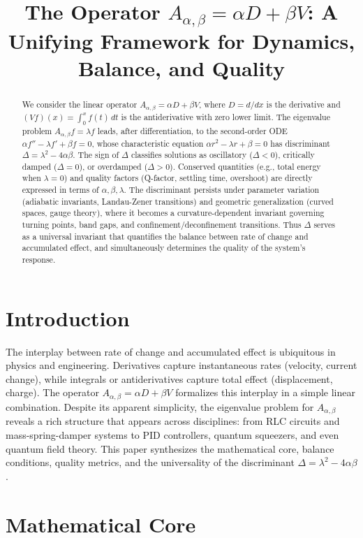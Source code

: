 \documentclass[11pt]{article}
\title{The Operator $A_{\alpha,\beta} = \alpha D + \beta V$: A Unifying Framework for Dynamics, Balance, and Quality}
\author{}
\date{}
\begin{document}
\maketitle
\begin{abstract}
We consider the linear operator $A_{\alpha,\beta} = \alpha D + \beta V$, where $D = d/dx$ is the derivative and $(V f)(x) = \int_0^x f(t)\,dt$ is the antiderivative with zero lower limit. The eigenvalue problem $A_{\alpha,\beta}f = \lambda f$ leads, after differentiation, to the second-order ODE $\alpha f'' - \lambda f' + \beta f = 0$, whose characteristic equation $\alpha r^2 - \lambda r + \beta = 0$ has discriminant $\Delta = \lambda^2 - 4\alpha\beta$. The sign of $\Delta$ classifies solutions as oscillatory ($\Delta<0$), critically damped ($\Delta=0$), or overdamped ($\Delta>0$). Conserved quantities (e.g., total energy when $\lambda=0$) and quality factors (Q-factor, settling time, overshoot) are directly expressed in terms of $\alpha,\beta,\lambda$. The discriminant persists under parameter variation (adiabatic invariants, Landau-Zener transitions) and geometric generalization (curved spaces, gauge theory), where it becomes a curvature-dependent invariant governing turning points, band gaps, and confinement/deconfinement transitions. Thus $\Delta$ serves as a universal invariant that quantifies the balance between rate of change and accumulated effect, and simultaneously determines the quality of the system's response.
\end{abstract}

\section{Introduction}
The interplay between rate of change and accumulated effect is ubiquitous in physics and engineering. Derivatives capture instantaneous rates (velocity, current change), while integrals or antiderivatives capture total effect (displacement, charge). The operator $A_{\alpha,\beta} = \alpha D + \beta V$ formalizes this interplay in a simple linear combination. Despite its apparent simplicity, the eigenvalue problem for $A_{\alpha,\beta}$ reveals a rich structure that appears across disciplines: from RLC circuits and mass-spring-damper systems to PID controllers, quantum squeezers, and even quantum field theory. This paper synthesizes the mathematical core, balance conditions, quality metrics, and the universality of the discriminant $\Delta = \lambda^2 - 4\alpha\beta$.

\section{Mathematical Core}
\end{document}
